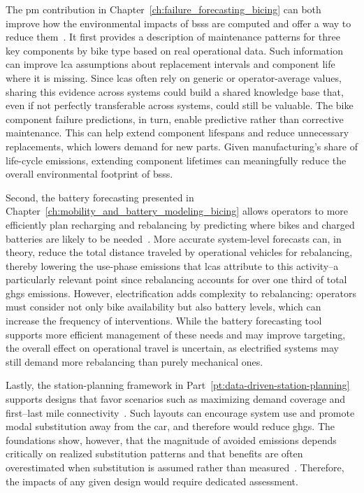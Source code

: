 The \ac{pm} contribution in Chapter~\ref{ch:failure_forecasting_bicing} can both improve how the environmental impacts of \acp{bss} are computed and offer a way to reduce them~\cite{Grau-Escolano2024}. It first provides a description of maintenance patterns for three key components by bike type based on real operational data. Such information can improve \ac{lca} assumptions about replacement intervals and component life where it is missing. Since \acp{lca} often rely on generic or operator-average values, sharing this evidence across systems could build a shared knowledge base that, even if not perfectly transferable across systems, could still be valuable. The bike component failure predictions, in turn, enable predictive rather than corrective maintenance. This can help extend component lifespans and reduce unnecessary replacements, which lowers demand for new parts. Given manufacturing's share of life-cycle emissions, extending component lifetimes can meaningfully reduce the overall environmental footprint of \acp{bss}.

Second, the battery forecasting presented in Chapter~\ref{ch:mobility_and_battery_modeling_bicing} allows operators to more efficiently plan recharging and rebalancing by predicting where bikes and charged batteries are likely to be needed~\cite{Bassolas2025}. More accurate system-level forecasts can, in theory, reduce the total distance traveled by operational vehicles for rebalancing, thereby lowering the use-phase emissions that \acp{lca} attribute to this activity--a particularly relevant point since rebalancing accounts for over one third of total \acp{ghg} emissions. However, electrification adds complexity to rebalancing: operators must consider not only bike availability but also battery levels, which can increase the frequency of interventions. While the battery forecasting tool supports more efficient management of these needs and may improve targeting, the overall effect on operational travel is uncertain, as electrified systems may still demand more rebalancing than purely mechanical ones.

Lastly, the station-planning framework in Part~\ref{pt:data-driven-station-planning} supports designs that favor scenarios such as maximizing demand coverage and first--last mile connectivity~\cite{GrauEscolano2025}. Such layouts can encourage system use and promote modal substitution away from the car, and therefore would reduce \acp{ghg}. The foundations show, however, that the magnitude of avoided emissions depends critically on realized substitution patterns and that benefits are often overestimated when substitution is assumed rather than measured~\cite{Kou2020, Saltykova2022, Liu2021}. Therefore, the impacts of any given design would require dedicated assessment.


